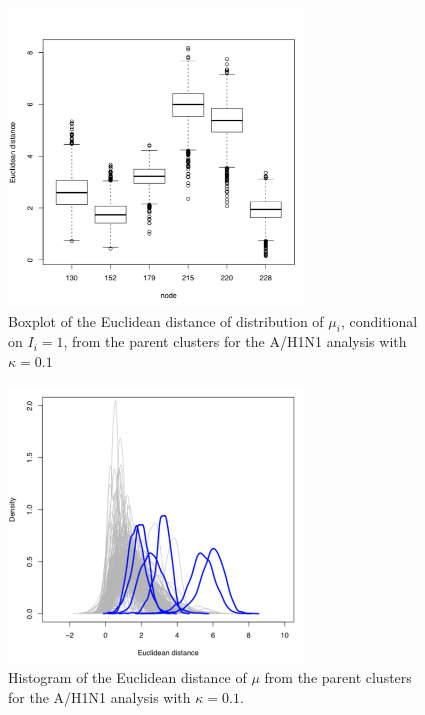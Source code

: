 \documentclass[11pt,oneside,letterpaper]{article}
\begin{document}
\begin{figure}[h]
	\centering		
	\includegraphics[width=0.7\textwidth]{figures/custom/H1N1Muboxplot}
	\caption{\textbf{}
Boxplot of the Euclidean distance of distribution of $\mu_i$, conditional on $I_i = 1$,  from the parent clusters for the A/H1N1 analysis with $\kappa=0.1$
	 		} 
	\label{H1N1Muboxplot} 
\end{figure}



\begin{figure}[h]
	\centering		
	\includegraphics[width=0.7\textwidth]{figures/custom/H1N1EDistOn}
	\caption{\textbf{}
Histogram of the Euclidean distance of $\mu$ from the parent clusters for the A/H1N1 analysis with $\kappa=0.1$.
	 		} 
	\label{H1N1MuEDistOn} 
\end{figure}
\end{document}
